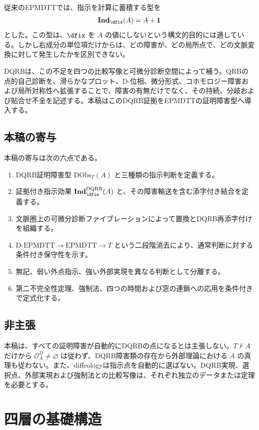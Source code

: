 \documentclass[a4paper,11pt]{ltjsarticle}
\theoremstyle{definition}
\theoremstyle{plain}
\newcommand{\DEPMDTT}{\mathrm{D}\text{-}\mathrm{EPMDTT}}
\newcommand{\EPMDTT}{\mathrm{EPMDTT}}
\newcommand{\DQRB}{\mathrm{DQRB}}
\newcommand{\DObs}{\mathrm{DObs}}
\newcommand{\Unit}{\mathbf 1}
\newcommand{\Ind}{\mathbf{Ind}_{\dfix}}
\newcommand{\DInd}{\mathbf{Ind}^{\DQRB}_{\dfix}}
\begin{document}
従来のEPMDTTでは、指示を計算に蓄積する型を
\begin{equation}
 \Ind(A)=A+\Unit
 \label{eq:plain-effect}
\end{equation}
とした。この型は、$\dfix$ を $A$ の値にしないという構文的目的には適している。しかし右成分の単位項だけからは、どの障害が、どの局所点で、どの文脈変換に対して発生したかを区別できない。

DQRBは、この不足を四つの比較写像と可微分診断空間によって補う。QRBの点的自己診断を、滑らかなプロット、D-位相、微分形式、コホモロジー障害および局所対称性へ拡張することで、障害の有無だけでなく、その持続、分岐および貼合せ不全を記述する\cite{ChibaDQRB2026}。本稿はこのDQRB証拠をEPMDTTの証明障害型へ導入する。

\subsection{本稿の寄与}

本稿の寄与は次の六点である。
\begin{enumerate}
 \item DQRB証明障害型 $\DObs_T(A)$ と三種類の指示判断を定義する。
 \item 証拠付き指示効果 $\DInd(A)$ と、その障害輸送を含む添字付き結合を定義する。
 \item 文脈圏上の可微分診断ファイブレーションによって置換とDQRB再添字付けを組織する。
 \item $\DEPMDTT\to\EPMDTT\to T$ という二段階消去により、通常判断に対する条件付き保守性を示す。
 \item 無記、弱い外点指示、強い外部実現を異なる判断として分離する。
 \item 第二不完全性定理、強制法、四つの時間および窓の連鎖への応用を条件付きで定式化する。
\end{enumerate}

\subsection{非主張}

本稿は、すべての証明障害が自動的にDQRBの点になるとは主張しない。$T\nvdash A$ だけから $\mathcal O_A^D\neq\varnothing$ は従わず、DQRB障害類の存在から外部理論における $A$ の真理も従わない。また、diffeologyは指示点を自動的に選ばない。DQRB実現、選択点、外部実現および強制法との比較写像は、それぞれ独立のデータまたは定理を必要とする。

\section{四層の基礎構造}
\end{document}
